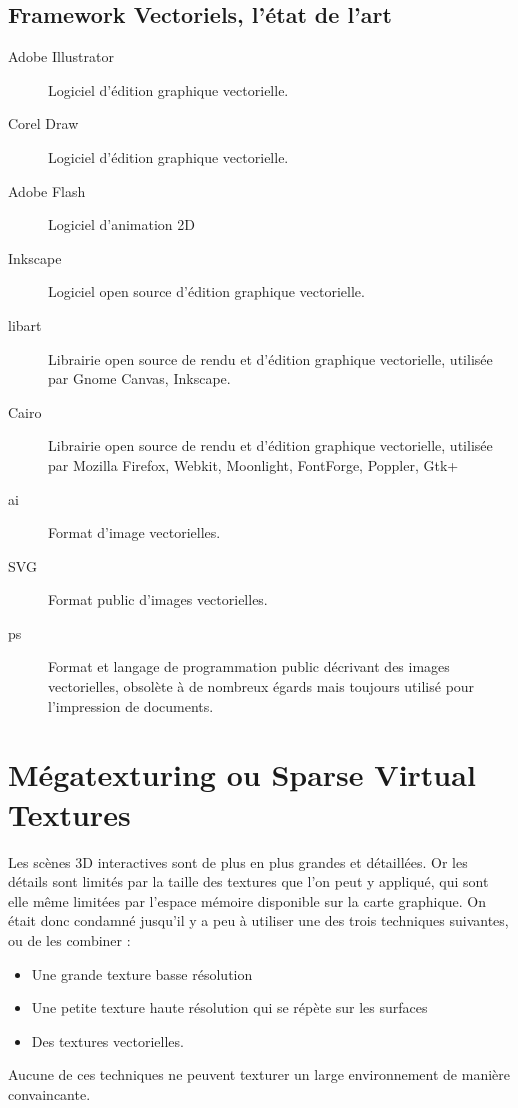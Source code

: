 		\subsection{Framework Vectoriels, l'état de l'art}
			\begin{description}
				\item[Adobe Illustrator]Logiciel d'édition graphique vectorielle. 
				\item[Corel Draw]Logiciel d'édition graphique vectorielle.
				\item[Adobe Flash]Logiciel d'animation 2D
				\item[Inkscape]Logiciel open source d'édition graphique vectorielle.
				\item[libart]Librairie open source de rendu et d'édition graphique vectorielle, utilisée par Gnome Canvas, Inkscape.
				\item[Cairo]Librairie open source de rendu et d'édition graphique vectorielle, utilisée par Mozilla Firefox, Webkit, Moonlight,
				FontForge, Poppler, Gtk+
				\item[ai]Format d'image vectorielles.
				\item[SVG]Format public d'images vectorielles.
				\item[ps]Format et langage de programmation public décrivant des images vectorielles, obsolète à de nombreux égards mais toujours utilisé pour l'impression de documents.  
			\end{description}

	\section{Mégatexturing ou Sparse Virtual Textures}
		Les scènes 3D interactives sont de plus en plus grandes et détaillées. Or les détails sont limités par la taille des textures que l'on peut y
		appliqué, qui sont elle même limitées par l'espace mémoire disponible sur la carte graphique. On était donc condamné jusqu'il y a peu à utiliser
		une des trois techniques suivantes, ou de les combiner : 
		\begin{itemize}
			\item Une grande texture basse résolution
			\item Une petite texture haute résolution qui se répète sur les surfaces
			\item Des textures vectorielles.
		\end{itemize}
		Aucune de ces techniques ne peuvent texturer un large environnement de manière convaincante. 


